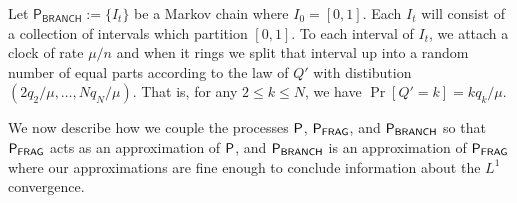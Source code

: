 \documentclass[12pt]{article}
\begin{document}
\begin{defn}  \label{branching-definition}
	Let $\mathsf{P}_{\mathsf{BRANCH}} := \{I_t\}$ be a Markov chain where $I_0 = [0, 1]$. Each $I_t$ will consist of a collection of intervals which partition $[0, 1]$. To each interval of $I_t$, we attach a clock of rate $\mu / n$ and when it rings we split that interval up into a random number of equal parts according to the law of $Q'$ with distibution $(2q_2 / \mu, \ldots, Nq_N /\mu)$. That is, for any $2 \leq k \leq N$, we have $\Pr[Q' = k] = kq_k/\mu$. 
\end{defn}

We now describe how we couple the processes $\mathsf{P}$, $\mathsf{P}_{\mathsf{FRAG}}$, and $\mathsf{P}_{\mathsf{BRANCH}}$ so that $\mathsf{P}_{\mathsf{FRAG}}$ acts as an approximation of $\mathsf{P}$, and $\mathsf{P}_{\mathsf{BRANCH}}$ is an approximation of $\mathsf{P}_{\mathsf{FRAG}}$ where our approximations are fine enough to conclude information about the $L^1$ convergence. 
\end{document}
